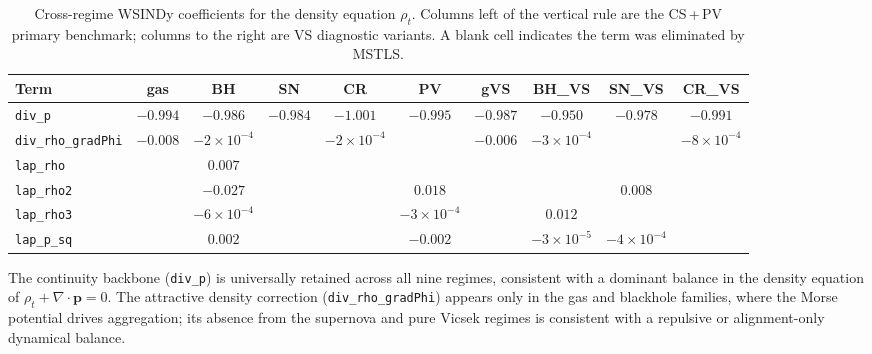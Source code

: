 \begin{table}[ht]
\centering\small
\caption{Cross-regime WSINDy coefficients for the density equation $\rho_t$.
Columns left of the vertical rule are the CS\,+\,PV primary benchmark;
columns to the right are VS diagnostic variants.
A blank cell indicates the term was eliminated by MSTLS\@.}
\label{tab:wsindy_cross_rho}
\begin{tabular}{l ccccc|cccc}
\toprule
\textbf{Term} & \textbf{gas} & \textbf{BH} & \textbf{SN} & \textbf{CR} & \textbf{PV} & \textbf{gVS} & \textbf{BH\_VS} & \textbf{SN\_VS} & \textbf{CR\_VS} \\
\midrule
\texttt{div\_p}             & $-0.994$ & $-0.986$ & $-0.984$ & $-1.001$ & $-0.995$ & $-0.987$ & $-0.950$ & $-0.978$ & $-0.991$ \\
\texttt{div\_rho\_gradPhi}  & $-0.008$ & $-2{\times}10^{-4}$ & & $-2{\times}10^{-4}$ & & $-0.006$ & $-3{\times}10^{-4}$ & & $-8{\times}10^{-4}$ \\
\texttt{lap\_rho}           &          & $0.007$  &          &          &          &          &          &          &          \\
\texttt{lap\_rho2}          &          & $-0.027$ &          &          & $0.018$  &          &          & $0.008$  &          \\
\texttt{lap\_rho3}          &          & $-6{\times}10^{-4}$ & &  & $-3{\times}10^{-4}$ & & $0.012$ & &  \\
\texttt{lap\_p\_sq}         &          & $0.002$  &          &  & $-0.002$ & & $-3{\times}10^{-5}$ & $-4{\times}10^{-4}$ &  \\
\bottomrule
\end{tabular}
\end{table}

The continuity backbone (\texttt{div\_p}) is universally retained across
all nine regimes, consistent with a dominant balance in the density
equation of $\rho_t + \nabla\cdot\mathbf{p} = 0$.  The attractive density
correction (\texttt{div\_rho\_gradPhi}) appears only in the gas and
blackhole families, where the Morse potential drives aggregation; its
absence from the supernova and pure Vicsek regimes is consistent with a
repulsive or alignment-only dynamical balance.

